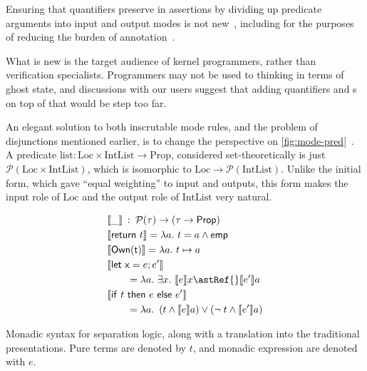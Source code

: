Ensuring that quantifiers preserve  in assertions by
dividing up predicate arguments into input and output modes is
not new~,
including for the purposes of reducing the burden of
annotation~.

What is new is the target audience of kernel programmers, rather than
verification specialists. Programmers may not be used to thinking in terms of
ghost state, and discussions with our users suggest that adding quantifiers and
s on top of that would be step too far.

An elegant solution to both inscrutable mode rules, and the problem of
disjunctions mentioned earlier, is to change the perspective on
\cref{fig:mode-pred}~. A predicate
$\mathrm{list} : \mathrm{Loc} \times \mathrm{IntList} \rightarrow
\mathrm{Prop}$, considered set-theoretically is just $\mathcal{P} (\mathrm{Loc}
\times \mathrm{IntList})$, which is isomorphic to $\mathrm{Loc} \rightarrow
\mathcal{P} (\mathrm{IntList})$. Unlike the initial form, which gave ``equal
weighting'' to input and outputs, this form makes the input role of
$\mathrm{Loc}$ and the output role of $\mathrm{IntList}$ very natural.

\begin{marginfigure}
    \begin{align*}
        &\llbracket \_ \rrbracket \::\: \mathcal{P}(\tau) \rightarrow (\tau \rightarrow \mathsf{Prop}) \\
        &\llbracket \mathsf{return}\ t \rrbracket = \lambda a.\ t = a \wedge{} \mathsf{emp} \\
        &\llbracket \mathsf{Own(t)} \rrbracket = \lambda a.\ t \mapsto{} a \\
        &\llbracket \mathsf{let\ x} = e; e' \rrbracket \\
        &\qquad = \lambda a.\ \exists x.\ \llbracket e \rrbracket x \astRef{} \llbracket e' \rrbracket a \\
        &\llbracket \mathsf{if}\ t\ \mathsf{then}\ e\ \mathsf{else}\ e' \rrbracket \\
        &\qquad = \lambda a.\  \left( t \wedge \llbracket e \rrbracket a \right) \vee \left( \neg\;t \wedge \llbracket e' \rrbracket a \right)
    \end{align*}
    \caption{Monadic syntax for separation logic, along with a translation into the traditional presentations. Pure
        terms are denoted by $t$, and monadic expression are denoted with $e$.}\label{fig:monad-sl}
\end{marginfigure}

